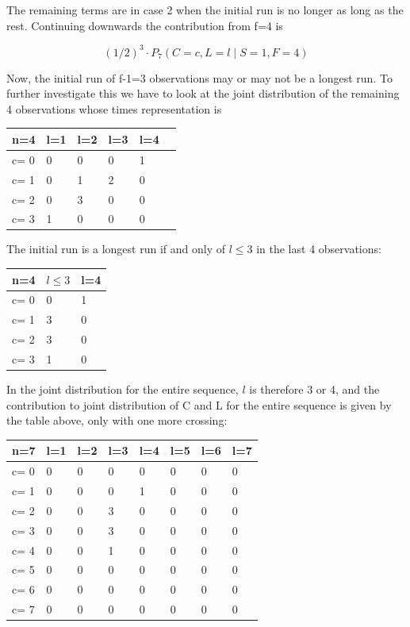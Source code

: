 The remaining terms are in case 2 when the initial run is no longer as long as the rest. Continuing downwards the contribution from f=4 is 

$$(1/2)^3 \cdot   P_7 (C=c, L=l \mid S=1,F=4)$$

Now, the initial run of f-1=3 observations may or may not be a longest run. To further investigate this we have to look at the joint distribution of the remaining 4 observations whose times representation is 

\begin{tabular}{l | l l l l l}
\hline
n=4&l=1&l=2&l=3&l=4\\
\hline
c= 0& 0& 0& 0& 1\\
c= 1& 0& 1& 2& 0\\
c= 2& 0& 3& 0& 0\\
c= 3& 1& 0& 0& 0\\
\hline
\end{tabular}

The initial run is a longest run if and only of $l \leq 3$ in the last 4 observations:

\begin{tabular}{l | l l}
\hline
n=4&$l \leq 3$&l=4\\
\hline
c= 0& 0& 1\\
c= 1& 3& 0\\
c= 2& 3& 0\\
c= 3& 1& 0\\
\hline
\end{tabular}

In the joint distribution for the entire sequence, $l$ is therefore 3 or 4, and the contribution to joint distribution of C and L for the entire sequence is given by the table above, only with one more crossing:

\begin{tabular}{l | l l l l l l l}
\hline
n=7&l=1&l=2&l=3&l=4&l=5&l=6&l=7\\
\hline
c= 0& 0& 0& 0& 0& 0& 0& 0\\
c= 1& 0& 0& 0& 1& 0& 0& 0\\
c= 2& 0& 0& 3& 0& 0& 0& 0\\
c= 3& 0& 0& 3& 0& 0& 0& 0\\
c= 4& 0& 0& 1& 0& 0& 0& 0\\
c= 5& 0& 0& 0& 0& 0& 0& 0\\
c= 6& 0& 0& 0& 0& 0& 0& 0\\
c= 7& 0& 0& 0& 0& 0& 0& 0\\
\hline
\end{tabular}

